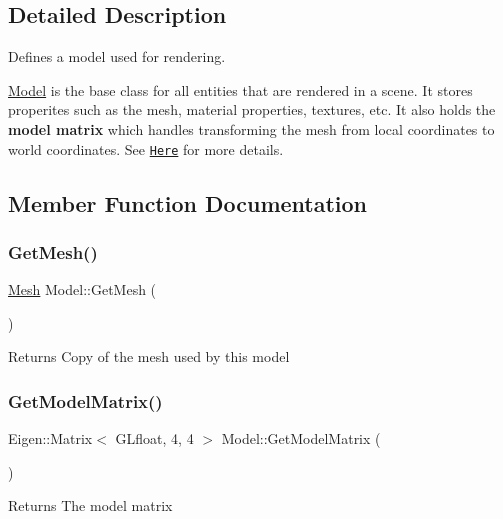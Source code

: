 \subsection{Detailed Description}
Defines a model used for rendering. 

\hyperlink{classModel}{Model} is the base class for all entities that are rendered in a scene. It stores properites such as the mesh, material properties, textures, etc. It also holds the {\bfseries model matrix} which handles transforming the mesh from local coordinates to world coordinates. See \href{https://learnopengl.com/#!Getting-started/Coordinate-Systems}{\tt Here} for more details. 

\subsection{Member Function Documentation}
\mbox{\label{classModel_a332f5a4ecf9bca582e583b3ff7784bf5}} 
\subsubsection{\texorpdfstring{Get\+Mesh()}{GetMesh()}}
{\footnotesize\ttfamily \hyperlink{classMesh}{Mesh} Model\+::\+Get\+Mesh (\begin{DoxyParamCaption}{ }\end{DoxyParamCaption})}

\begin{DoxyReturn}{Returns}
Copy of the mesh used by this model 
\end{DoxyReturn}
\mbox{\label{classModel_af37e550b25274838de666ddc7e2167d6}} 
\subsubsection{\texorpdfstring{Get\+Model\+Matrix()}{GetModelMatrix()}}
{\footnotesize\ttfamily Eigen\+::\+Matrix$<$ G\+Lfloat, 4, 4 $>$ Model\+::\+Get\+Model\+Matrix (\begin{DoxyParamCaption}{ }\end{DoxyParamCaption})}

\begin{DoxyReturn}{Returns}
The model matrix 
\end{DoxyReturn}
\mbox{\label{classModel_a6b79c9e0c9abc50896e70fe1fabff4e7}} 
